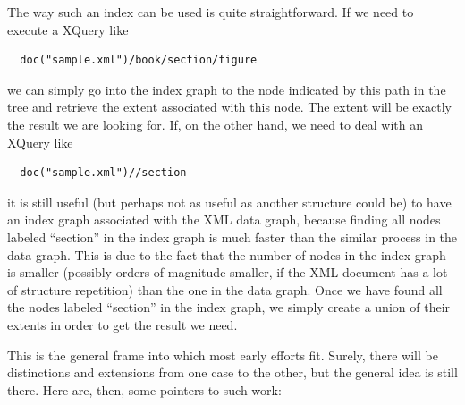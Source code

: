 \documentclass[a4paper,10pt]{article}
\begin{document}
The way such an index can be used is quite straightforward. If we need to execute a XQuery
like

\begin{verbatim}
  doc("sample.xml")/book/section/figure
\end{verbatim}

we can simply go into the index graph to the node indicated by this path in the tree and retrieve
the extent associated with this node. The extent will be exactly the result we are looking for. If,
on the other hand, we need to deal with an XQuery like

\begin{verbatim}
  doc("sample.xml")//section
\end{verbatim}

it is still useful (but perhaps not as useful as another structure could be) to have an index graph
associated with the XML data graph, because finding all nodes labeled ``section'' in the index graph
is much faster than the similar process in the data graph. This is due to the fact that the number of nodes
in the index graph is smaller (possibly orders of magnitude smaller, if the XML document has a
lot of structure repetition) than the one in the data graph. Once we have found all the nodes
labeled ``section'' in the index graph, we simply create a union of their extents in order to get
the result we need.

This is the general frame into which most early efforts fit. Surely, there will be distinctions
and extensions from one case to the other, but the general idea is still there. Here are, then, some
pointers to such work:
\end{document}
